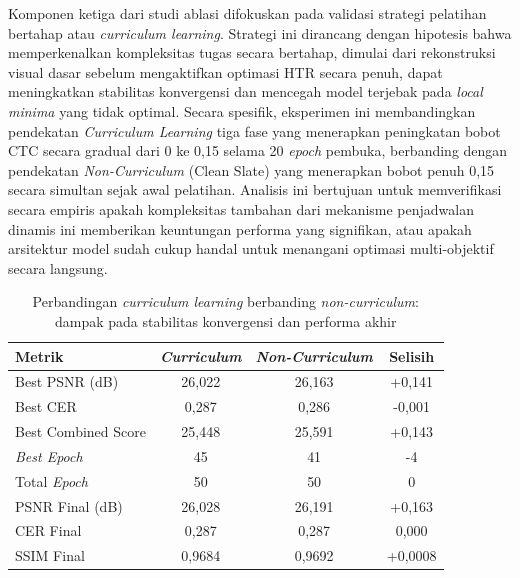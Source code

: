 \documentclass[12pt,a4paper]{article}
\begin{document}
Komponen ketiga dari studi ablasi difokuskan pada validasi strategi pelatihan bertahap atau \textit{curriculum learning}. Strategi ini dirancang dengan hipotesis bahwa memperkenalkan kompleksitas tugas secara bertahap, dimulai dari rekonstruksi visual dasar sebelum mengaktifkan optimasi HTR secara penuh, dapat meningkatkan stabilitas konvergensi dan mencegah model terjebak pada \textit{local minima} yang tidak optimal. Secara spesifik, eksperimen ini membandingkan pendekatan \textit{Curriculum Learning} tiga fase yang menerapkan peningkatan bobot CTC secara gradual dari 0 ke 0,15 selama 20 \textit{epoch} pembuka, berbanding dengan pendekatan \textit{Non-Curriculum} (Clean Slate) yang menerapkan bobot penuh 0,15 secara simultan sejak awal pelatihan. Analisis ini bertujuan untuk memverifikasi secara empiris apakah kompleksitas tambahan dari mekanisme penjadwalan dinamis ini memberikan keuntungan performa yang signifikan, atau apakah arsitektur model sudah cukup handal untuk menangani optimasi multi-objektif secara langsung.

\begin{table}[!htbp]
    \caption[Performa curriculum berbanding non-curriculum]{Perbandingan \textit{curriculum learning} berbanding \textit{non-curriculum}: dampak pada stabilitas konvergensi dan performa akhir}
    \label{tab:curriculum-comparison}
    \begin{tabularx}{\textwidth}{|>{\raggedright\arraybackslash}X|c|c|c|}
        \toprule
        \textbf{Metrik}              & \textbf{\textit{Curriculum}} & \textbf{\textit{Non-Curriculum}} & \textbf{Selisih} \\
        \midrule
        Best PSNR (dB)      & 26,022     & 26,163         & +0,141  \\
        Best CER            & 0,287      & 0,286          & -0,001  \\
        Best Combined Score & 25,448     & 25,591         & +0,143  \\
        \textit{Best Epoch}          & 45         & 41             & -4      \\
        Total \textit{Epoch}        & 50         & 50             & 0       \\
        \midrule
        PSNR Final (dB)     & 26,028     & 26,191         & +0,163  \\
        CER Final           & 0,287      & 0,287          & 0,000   \\
        SSIM Final          & 0,9684     & 0,9692         & +0,0008 \\
        \bottomrule
    \end{tabularx}
\end{table}
\end{document}
